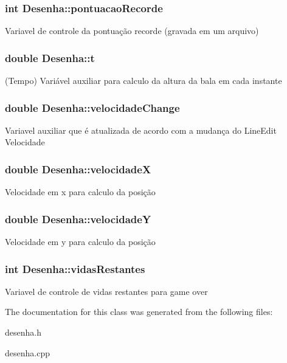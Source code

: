 \subsubsection[{pontuacao\+Recorde}]{\setlength{\rightskip}{0pt plus 5cm}int Desenha\+::pontuacao\+Recorde}\label{class_desenha_a1af9232144a2e45fbda9f070173de673}
Variavel de controle da pontuação recorde (gravada em um arquivo) 
\subsubsection[{t}]{\setlength{\rightskip}{0pt plus 5cm}double Desenha\+::t}\label{class_desenha_a27c8e712de40b78ce378b6b3b1b323e1}
(Tempo) Variável auxiliar para calculo da altura da bala em cada instante 
\subsubsection[{velocidade\+Change}]{\setlength{\rightskip}{0pt plus 5cm}double Desenha\+::velocidade\+Change}\label{class_desenha_aafbb86ab55a0744d5cc091d53f981060}
Variavel auxiliar que é atualizada de acordo com a mudança do Line\+Edit Velocidade 
\subsubsection[{velocidade\+X}]{\setlength{\rightskip}{0pt plus 5cm}double Desenha\+::velocidade\+X}\label{class_desenha_a7982445d86436b2bfb927eda2141fc96}
Velocidade em x para calculo da posição 
\subsubsection[{velocidade\+Y}]{\setlength{\rightskip}{0pt plus 5cm}double Desenha\+::velocidade\+Y}\label{class_desenha_aaa45723dda585e775cd59ebf5a1968ba}
Velocidade em y para calculo da posição 
\subsubsection[{vidas\+Restantes}]{\setlength{\rightskip}{0pt plus 5cm}int Desenha\+::vidas\+Restantes}\label{class_desenha_abdb75d750c6aa4b0c09a3b7758f2c660}
Variavel de controle de vidas restantes para game over 

The documentation for this class was generated from the following files\+:\begin{DoxyCompactItemize}
\item 
desenha.\+h\item 
desenha.\+cpp\end{DoxyCompactItemize}
